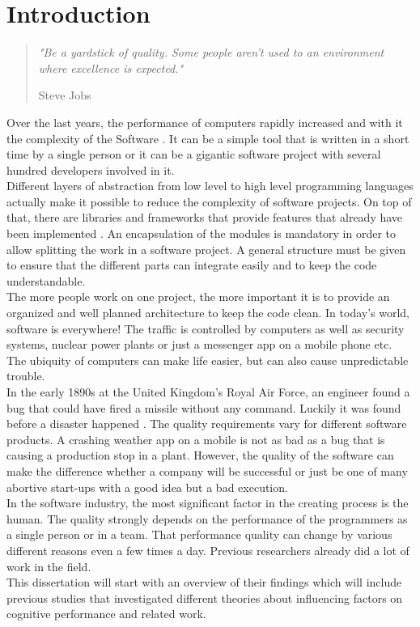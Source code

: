 \chapter{Introduction}

\begin{quote}
\centering 
\em %
"Be a yardstick of quality. Some people aren't used to an environment where excellence is expected."

\medskip
\raggedleft
Steve Jobs
\end{quote}
\vspace{10 mm}

Over the last years, the performance of computers rapidly increased and with it the complexity of the Software \cite{wirth2008brief}.
It can be a simple tool that is written in a short time by a single person or it can be a gigantic software project with several hundred developers involved in it\cite{cusumano1997microsoft}.\\
Different layers of abstraction from low level to high level programming languages actually make it possible to reduce the complexity of software projects. On top of that, there are libraries and frameworks that provide features that already have been implemented \cite{Martin:2008:CCH:1388398}.
An encapsulation of the modules is mandatory in order to allow splitting the work in a software project. A general structure must be given to ensure that the different parts can integrate easily and to keep the code understandable.\\
The more people work on one project, the more important it is to provide an organized and well planned architecture to keep the code clean.
\bigbreak
In today's world, software is everywhere! The traffic is controlled by computers as well as security systems, nuclear power plants or just a messenger app on a mobile phone etc. \\
The ubiquity of computers can make life easier, but can also cause unpredictable trouble.\\
In the early 1890s at the United Kingdom's Royal Air Force, an engineer found a bug that could have fired a missile without any command. Luckily it was found before a disaster happened \cite{ross2005exterminators}.
\bigbreak
The quality requirements vary for different software products. A crashing weather app on a mobile is not as bad as a bug that is causing a production stop in a plant. 
However, the quality of the software can make the difference whether a company will be successful or just be one of many abortive start-ups with a good idea but a bad execution.
\\
In the software industry, the most significant factor in the creating process is the human. The quality strongly depends on the performance of the programmers as a single person or in a team. That performance quality can change by various different reasons even a few times a day.
\bigbreak 
Previous researchers already did a lot of work in the field. \\
This dissertation will start with an overview of their findings which will include previous studies that investigated different theories about influencing factors on cognitive performance and related work.

